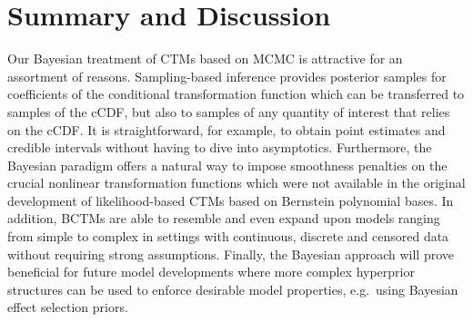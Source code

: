 \documentclass[12pt]{article}
\theoremstyle{plain}
\begin{document}









\section{Summary and Discussion}\label{sec:summary}
Our Bayesian treatment of CTMs based on MCMC is attractive for an assortment of reasons. Sampling-based inference provides posterior samples for coefficients of the conditional transformation function which can be transferred to samples of the cCDF, but also to samples of any quantity of interest that relies on the cCDF. It is straightforward, for example, to obtain point estimates and credible intervals without having to dive into asymptotics. Furthermore, the Bayesian paradigm offers a natural way to impose smoothness penalties on the crucial nonlinear transformation functions which were not available in the original development of likelihood-based CTMs based on Bernstein polynomial bases. In addition, BCTMs are able to resemble and even expand upon models ranging from simple to complex in settings with continuous, discrete and censored data without requiring strong assumptions. Finally, the Bayesian approach will prove beneficial for future model developments where more complex hyperprior structures can be used to enforce desirable model properties, e.g.~using Bayesian effect selection priors.
\end{document}
